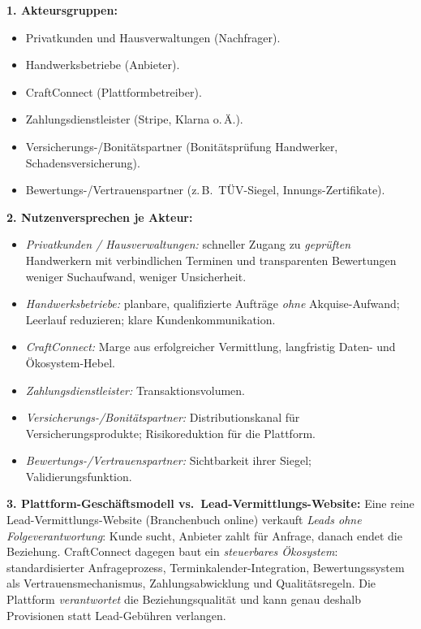 \documentclass[11pt,a4paper,oneside]{article}
\begin{document}
\begin{loesungbox}
\textbf{1. Akteursgruppen:}
\begin{itemize}
  \item Privatkunden und Hausverwaltungen (Nachfrager).
  \item Handwerksbetriebe (Anbieter).
  \item CraftConnect (Plattformbetreiber).
  \item Zahlungsdienstleister (Stripe, Klarna o.\,Ä.).
  \item Versicherungs-/Bonitätspartner (Bonitätsprüfung Handwerker, Schadensversicherung).
  \item Bewertungs-/Vertrauenspartner (z.\,B.\ TÜV-Siegel, Innungs-Zertifikate).
\end{itemize}

\textbf{2. Nutzenversprechen je Akteur:}
\begin{itemize}
  \item \emph{Privatkunden / Hausverwaltungen:} schneller Zugang zu \emph{geprüften} Handwerkern mit verbindlichen Terminen und transparenten Bewertungen \textendash{} weniger Suchaufwand, weniger Unsicherheit.
  \item \emph{Handwerksbetriebe:} planbare, qualifizierte Aufträge \emph{ohne} Akquise-Aufwand; Leerlauf reduzieren; klare Kundenkommunikation.
  \item \emph{CraftConnect:} Marge aus erfolgreicher Vermittlung, langfristig Daten- und Ökosystem-Hebel.
  \item \emph{Zahlungsdienstleister:} Transaktionsvolumen.
  \item \emph{Versicherungs-/Bonitätspartner:} Distributionskanal für Versicherungsprodukte; Risikoreduktion für die Plattform.
  \item \emph{Bewertungs-/Vertrauenspartner:} Sichtbarkeit ihrer Siegel; Validierungsfunktion.
\end{itemize}

\textbf{3. Plattform-Geschäftsmodell vs.\ Lead-Vermittlungs-Website:}
Eine reine Lead-Vermittlungs-Website (Branchenbuch online) verkauft \emph{Leads ohne Folgeverantwortung}: Kunde sucht, Anbieter zahlt für Anfrage, danach endet die Beziehung. CraftConnect dagegen baut ein \emph{steuerbares Ökosystem}: standardisierter Anfrageprozess, Terminkalender-Integration, Bewertungssystem als Vertrauensmechanismus, Zahlungsabwicklung und Qualitätsregeln. Die Plattform \emph{verantwortet} die Beziehungsqualität \textendash{} und kann genau deshalb Provisionen statt Lead-Gebühren verlangen.


\end{loesungbox}
\end{document}
